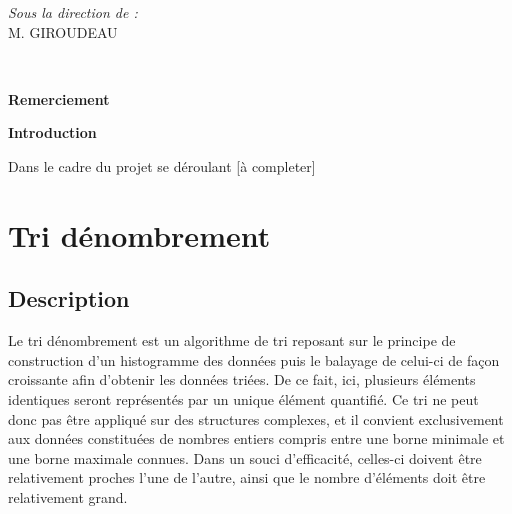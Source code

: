 \documentclass[12pt]{article}
\begin{document}
\begin{titlepage}
\begin{minipage}{0.4\textwidth}
			\begin{flushright} \large
			\emph{Sous la direction de  :} \\
			M. GIROUDEAU\\
        
		\end{flushright}
        
	\end{minipage}\\[2 cm]
	
	
    
    
    
    
	
\end{titlepage}

\LARGE\textbf{Remerciement}\\ \vspace{0.5 cm}

\newpage

\LARGE\textbf{Introduction}\\ \vspace{0.5 cm}

\normalsize{Dans le cadre du projet se déroulant  [à completer]}





\newpage

\tableofcontents

\newpage





\section{Tri dénombrement}
\subsection{Description}



\hspace{1.0 cm} Le tri dénombrement est un algorithme de tri reposant sur le principe de construction d'un histogramme des données puis le balayage de celui-ci de façon croissante afin d'obtenir les données triées.
De ce fait, ici, plusieurs éléments identiques seront représentés par un unique élément quantifié. Ce tri ne peut donc pas être appliqué sur des structures complexes, et il convient exclusivement aux données constituées de nombres entiers compris entre une borne minimale et une borne maximale connues. Dans un souci d'efficacité, celles-ci doivent être relativement proches l'une de l'autre, ainsi que le nombre d'éléments doit être relativement grand. 
\end{document}
